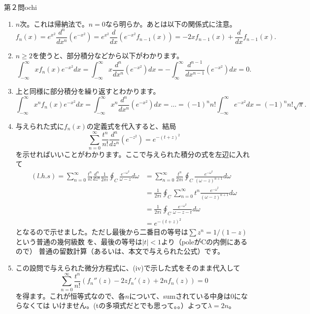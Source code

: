 \begin{answer}{第２問}{ochi}
\begin{enumerate}
\item
  $n$次。これは帰納法で。$n=0$なら明らか。あとは以下の関係式に注意。
  \begin{equation}
    f_n(x)
      =e^{x^2}\frac{d^n}{dx^n}(e^{-x^2})=e^{x^2}\frac{d}{dx}(e^{-x^2}f_{n-1}(x))
      =-2xf_{n-1}(x)+\frac{d}{dx}f_{n-1}(x).
  \end{equation}

\item
  $n\geq 2$を使うと、部分積分などから以下がわかります。
  \begin{equation}
    \int_{-\infty}^{\infty}xf_n(x)e^{-x^2}dx=\int_{-\infty}^{\infty}x\frac{d^n}{dx^n}(e^{-x^2})dx=
      -\int_{\infty}^{\infty}\frac{d^{n-1}}{dx^{n-1}}(e^{-x^2})dx=0.
  \end{equation}

\item
  上と同様に部分積分を繰り返すとわかります。
  \begin{equation}
    \int_{-\infty}^{\infty}x^nf_n(x)e^{-x^2}dx=\int_{-\infty}^{\infty}x^n\frac{d^n}{dx^n}(e^{-x^2})dx
      =\dots=(-1)^n n! \int_{-\infty}^{\infty}e^{-x^2}dx=(-1)^nn!\sqrt{\pi}.
  \end{equation}

\item
  与えられた式に$f_n(x)$の定義式を代入すると、結局
  \begin{equation}
    \sum_{n=0}^{\infty}\frac{t^n}{n!}\frac{d^n}{dz^n}(e^{-z^2})=e^{-(t+z)^2}
  \end{equation}
  を示せればいいことがわかります。ここで与えられた積分の式を左辺に入れて
  \begin{align}
    (l.h.s)=\sum_{n=0}^{\infty}\frac{t^n}{n!}\frac{d^n}{dz^n}\frac{1}{2\pi i}\oint_C
      \frac{e^{-\omega ^2}}{\omega -z}d\omega
      &=\sum_{n=0}^{\infty}\frac{t^n}{2\pi i}\oint_C
        \frac{e^{-\omega ^2}}{(\omega -z)^{n+1}}d\omega \\
      &=\frac{1}{2\pi i}\oint_C \sum_{n=0}^{\infty} t^n
        \frac{e^{-\omega ^2}}{(\omega -z)^{n+1}}d\omega \\
      &=\frac{1}{2\pi i}\oint_C \frac{e^{-\omega ^2}}{\omega -z-t}d\omega \\
      &=e^{-(t+z)^2}
  \end{align}
  となるので示せました。ただし最後から二番目の等号は$\sum z^n=1/(1-z)$という普通の幾何級数
  を、最後の等号は$|t|<1$より（poleがCの内側にあるので）
  普通の留数計算（あるいは、本文で与えられた公式）です。

\item
  この設問で与えられた微分方程式に、(iv)で示した式をそのまま代入して
  \begin{equation}
    \sum_{n=0}^{\infty}\frac{t^n}{n!}(f_n''(z)-2zf_n'(z)+2nf_n(z))=0
  \end{equation}
  を得ます。これが恒等式なので、各$n$について、sumされている中身は0にならなくては
  いけません。(tの多項式だとでも思って。。）よって$\lambda=2n$。
\end{enumerate}
\end{answer}
